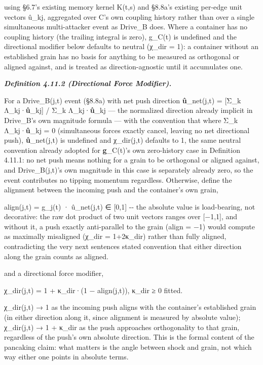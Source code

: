\documentclass[
]{article}
\begin{document}
using §6.7's existing memory kernel K(t,s) and §8.8a's existing per-edge
unit vectors û\_kj, aggregated over C's own coupling history rather than
over a single simultaneous multi-attacker event as Drive\_B does. Where
a container has no coupling history (the trailing integral is zero),
g\_C(t) is undefined and the directional modifier below defaults to
neutral (χ\_dir = 1): a container without an established grain has no
basis for anything to be measured as orthogonal or aligned against, and
is treated as direction-agnostic until it accumulates one.

\emph{\textbf{Definition 4.11.2 (Directional Force Modifier).}}

For a Drive\_B(j,t) event (§8.8a) with net push direction
\textbf{û}\_net(j,t) = {[}Σ\_k Λ\_kj·\textbf{û}\_kj{]} / Σ\_k
Λ\_kj·\textbf{û}\_kj --- the normalized direction already implicit in
Drive\_B's own magnitude formula --- with the convention that where Σ\_k
Λ\_kj·\textbf{û}\_kj = 0 (simultaneous forces exactly cancel, leaving no
net directional push), \textbf{û}\_net(j,t) is undefined and χ\_dir(j,t)
defaults to 1, the same neutral convention already adopted for
\textbf{g}\_C(t)'s own zero-history case in Definition 4.11.1: no net
push means nothing for a grain to be orthogonal or aligned against, and
Drive\_B(j,t)'s own magnitude in this case is separately already zero,
so the event contributes no tipping momentum regardless. Otherwise,
define the alignment between the incoming push and the container's own
grain,

align(j,t) = \textbar g\_j(t) · û\_net(j,t)\textbar{} ∈ {[}0,1{]} -\/-
the absolute value is load-bearing, not decorative: the raw dot product
of two unit vectors ranges over {[}−1,1{]}, and without it, a push
exactly anti-parallel to the grain (align = −1) would compute as
maximally misaligned (χ\_dir = 1+2κ\_dir) rather than fully aligned,
contradicting the very next sentence\textquotesingle s stated convention
that either direction along the grain counts as aligned.

and a directional force modifier,

χ\_dir(j,t) = 1 + κ\_dir·(1 − align(j,t)), κ\_dir ≥ 0 fitted.

χ\_dir(j,t) → 1 as the incoming push aligns with the container's
established grain (in either direction along it, since alignment is
measured by absolute value); χ\_dir(j,t) → 1 + κ\_dir as the push
approaches orthogonality to that grain, regardless of the push's own
absolute direction. This is the formal content of the pancaking claim:
what matters is the angle between shock and grain, not which way either
one points in absolute terms.
\end{document}
